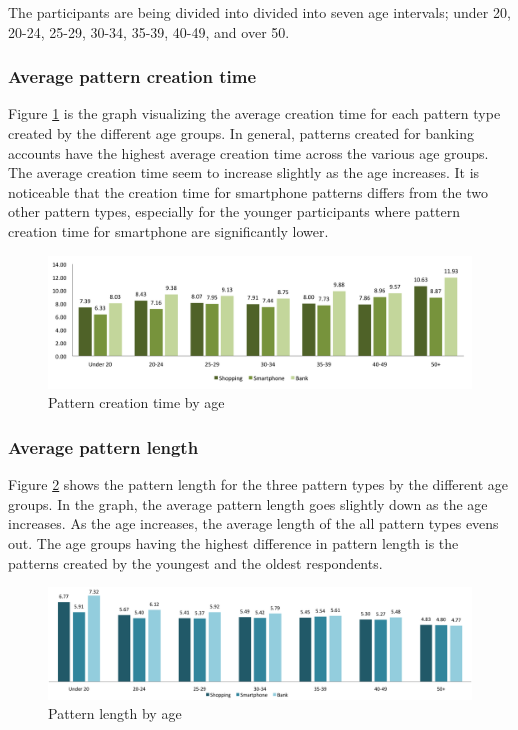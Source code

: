     The participants are being divided into divided into seven age intervals; under 20, 20-24, 25-29, 30-34, 35-39, 40-49, and over 50. 

    \subsubsection{Average pattern creation time}
    Figure \ref{fig:patterncreationtimeage} is the graph visualizing the average creation time for each pattern type created by the different age groups. In general, patterns created for banking accounts have the highest average creation time across the various age groups. The average creation time seem to increase slightly as the age increases. It is noticeable that the creation time for smartphone patterns differs from the two other pattern types, especially for the younger participants where pattern creation time for smartphone are significantly lower. 

    \begin{figure}[H]
      \centering
      \includegraphics[width=\textwidth]{pics/analysis/creationtime-age.png}
      \caption{Pattern creation time by age}
      \label{fig:patterncreationtimeage}
    \end{figure}

    \clearpage
    \subsubsection{Average pattern length}
    Figure \ref{fig:patternlengthage} shows the pattern length for the three pattern types by the different age groups. In the graph, the average pattern length goes slightly down as the age increases. As the age increases, the average length of the all pattern types evens out. The age groups having the highest difference in pattern length is the patterns created by the youngest and the oldest respondents. 

  	\begin{figure}[H]
	    \centering
	    \includegraphics[width=\textwidth]{pics/analysis/avgpatternlength-age.png}
	    \caption{Pattern length by age}
	    \label{fig:patternlengthage}
  	\end{figure}

